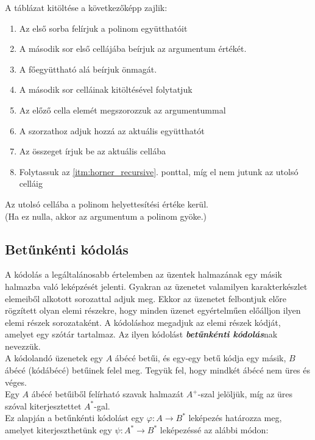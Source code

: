 \documentclass[12pt,margin=0px]{article}
\begin{document}
	\noindent A táblázat kitöltése a következőképp zajlik:
	\begin{enumerate}
        \item Az első sorba felírjuk a polinom együtthatóit
        \item A második sor első cellájába beírjuk az argumentum értékét.
        \item A főegyüttható alá beírjuk önmagát.
        \item A második sor celláinak kitöltésével folytatjuk
        \item \label{itm:horner_recursive} Az előző cella elemét megszorozzuk az argumentummal
        \item A szorzathoz adjuk hozzá az aktuális együtthatót
        \item Az összeget írjuk be az aktuális cellába
        \item Folytassuk az \ref{itm:horner_recursive}. ponttal, míg el nem jutunk az utolsó celláig
	\end{enumerate}
			
	\noindent Az utolsó cellába a polinom helyettesítési értéke kerül.\\
    (Ha ez nulla, akkor az argumentum a polinom gyöke.)

	\subsection*{Betűnkénti kódolás}

    A kódolás a legáltalánosabb értelemben az üzentek halmazának egy másik halmazba való leképzését jelenti. Gyakran az üzenetet valamilyen karakterkészlet elemeiből alkotott sorozattal adjuk meg. Ekkor az üzenetet felbontjuk előre rögzített olyan elemi részekre, hogy minden üzenet egyértelműen előálljon ilyen elemi részek sorozataként. A kódoláshoz megadjuk az elemi részek kódját, amelyet egy szótár tartalmaz. Az ilyen kódolást \emph{\textbf{betűnkénti kódolás}}nak nevezzük.\\
			
    \noindent A kódolandó üzenetek egy $A$ ábécé betűi, és egy-egy betű kódja egy másik, $B$ ábécé (kódábécé) betűinek felel meg. Tegyük fel, hogy mindkét ábécé nem üres és véges.\\
			
    \noindent Egy $A$ ábécé betűiből felírható szavak halmazát $A^+$-szal jelöljük, míg az üres szóval kiterjesztettet $A^*$-gal.\\
			
    \noindent Ez alapján a betűnkénti kódolást egy $\varphi: A \rightarrow B^*$ leképezés határozza meg, amelyet kiterjeszthetünk egy $\psi: A^* \rightarrow B^*$ leképezéssé az alábbi módon:\\
\end{document}
